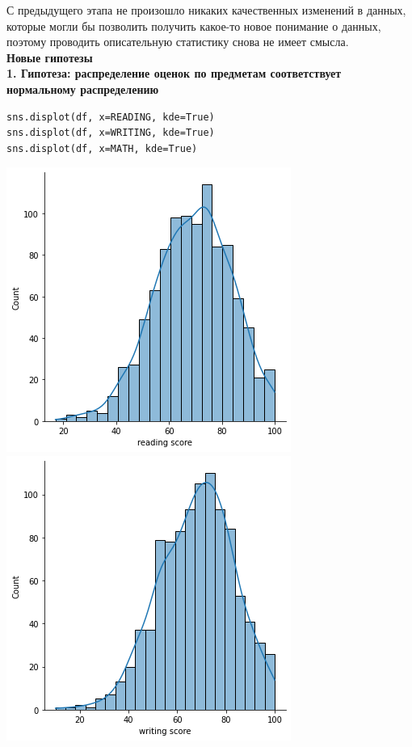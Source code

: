 \documentclass[12pt,a4paper]{article}
\begin{document}
С предыдущего этапа не произошло никаких качественных изменений в данных, которые могли бы позволить получить какое-то новое понимание о данных, поэтому проводить описательную статистику снова не имеет смысла. \\

\textbf{Новые гипотезы}\\


\textbf{1. Гипотеза: распределение оценок по предметам соответствует нормальному распределению} \\

\begin{verbatim}
sns.displot(df, x=READING, kde=True)
sns.displot(df, x=WRITING, kde=True)
sns.displot(df, x=MATH, kde=True)
\end{verbatim} 


\includegraphics{scores_reading} \\
\includegraphics{scores_writing} \\
\end{document}
